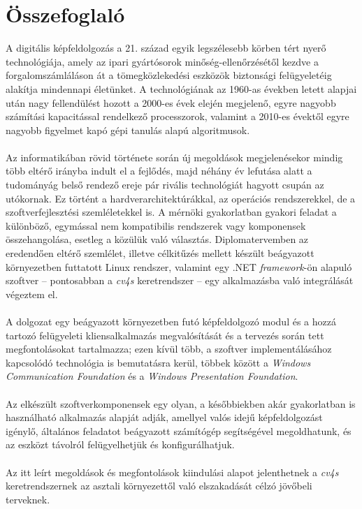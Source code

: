 \chapter*{Összefoglaló}

A digitális képfeldolgozás a 21. század egyik legszélesebb körben tért nyerő technológiája, amely az ipari gyártósorok minőség-ellenőrzésétől kezdve a forgalomszámláláson át a tömegközlekedési eszközök biztonsági felügyeletéig alakítja mindennapi életünket. A technológiának az 1960-as években letett alapjai után nagy fellendülést hozott a 2000-es évek elején megjelenő, egyre nagyobb számítási kapacitással rendelkező processzorok, valamint a 2010-es évektől egyre nagyobb figyelmet kapó gépi tanulás alapú algoritmusok.\\
\\
Az informatikában rövid története során új megoldások megjelenésekor mindig több eltérő irányba indult el a fejlődés, majd néhány év lefutása alatt a tudományág belső rendező ereje pár rivális technológiát hagyott csupán az utókornak. Ez történt a hardverarchitektúrákkal, az operációs rendszerekkel, de a szoftverfejlesztési szemléletekkel is. A mérnöki gyakorlatban gyakori feladat a különböző, egymással nem kompatibilis rendszerek vagy komponensek összehangolása, esetleg a közülük való választás. Diplomatervemben az eredendően eltérő szemlélet, illetve célkitűzés mellett készült beágyazott környezetben futtatott Linux rendszer, valamint egy .NET \emph{framework}-ön alapuló szoftver -- pontosabban a \emph{cv4s} keretrendszer -- egy alkalmazásba való integrálását végeztem el.\\
\\
A dolgozat egy beágyazott környezetben futó képfeldolgozó modul és a hozzá tartozó felügyeleti kliensalkalmazás megvalósítását és a tervezés során tett megfontolásokat tartalmazza; ezen kívül több, a szoftver implementálásához kapcsolódó technológia is bemutatásra kerül, többek között a \emph{Windows Communication Foundation} és a \emph{Windows Presentation Foundation}.\\
\\
Az elkészült szoftverkomponensek egy olyan, a későbbiekben akár gyakorlatban is használható alkalmazás alapját adják, amellyel valós idejű képfeldolgozást igénylő, általános feladatot beágyazott számítógép segítségével megoldhatunk, és az eszközt távolról felügyelhetjük és konfigurálhatjuk.\\
\\
Az itt leírt megoldások és megfontolások kiindulási alapot jelenthetnek a \emph{cv4s} keretrendszernek az asztali környezettől való elszakadását célzó jövőbeli terveknek.
